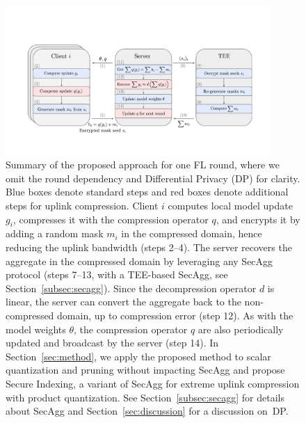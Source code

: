 \documentclass[11pt]{article}
\newcommand{\SecAgg}{{\sc SecAgg}\xspace}
\newcommand{\modif}[1]{{\color{black}#1}}
\begin{document}
\begin{figure}[t]
    \centering
    \includegraphics[width=0.9\textwidth]{submissions/GrahamCormode/figs/secagg_summary_new.pdf}
    \caption{\label{fig:secagg_summary}
    Summary of the proposed approach for one FL round, where we omit the round dependency and \modif{Differential Privacy (DP)} for clarity. Blue boxes denote standard steps and red boxes denote additional steps for uplink compression. Client $i$ computes local model update $g_i$, compresses it with the compression operator $q$, and encrypts it by adding a random mask $m_i$ in the compressed domain, hence reducing the uplink bandwidth (steps 2--4). The server recovers the aggregate in the compressed domain by leveraging any \SecAgg protocol \modif{(steps 7--13, with a TEE-based \SecAgg, see Section~\ref{subsec:secagg})}. Since the decompression operator $d$ is linear, the server can convert the aggregate back to the non-compressed domain, up to compression error (step 12). As with the model weights $\theta$, the compression operator $q$ are also periodically updated and broadcast by the server (step 14).
    In Section~\ref{sec:method}, we apply the proposed method to scalar quantization and pruning without impacting \SecAgg and propose Secure Indexing, a variant of \SecAgg for extreme uplink compression with product quantization. See Section~\ref{subsec:secagg} for details about \SecAgg and Section~\ref{sec:discussion} for a discussion on~DP.
    }
    \vspace{-3mm}
\end{figure}




\end{document}
